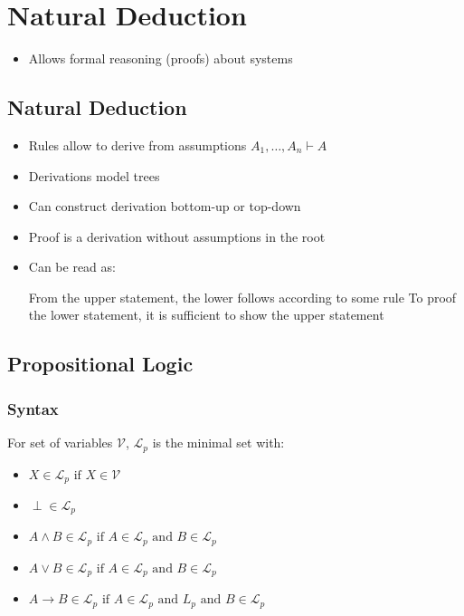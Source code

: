 
\section{Natural Deduction}
\begin{itemize}
    \item Allows formal reasoning (proofs) about systems
\end{itemize}

\subsection{Natural Deduction}
\begin{itemize}
    \item Rules allow to derive from assumptions $A_1, \dots , A_n \vdash A$
    \item Derivations model trees
    \item Can construct derivation bottom-up or top-down
    \item Proof is a derivation without assumptions in the root
    \item Can be read as:
        \begin{itemize}
             From the upper statement, the lower follows according to some rule
             To proof the lower statement, it is sufficient to show the upper statement
        \end{itemize}
\end{itemize}

\subsection{Propositional Logic}
\subsubsection{Syntax}
\begin{itemize}
     For set of variables $\mathcal{V}$, $\mathcal{L}_p$ is the minimal set with:
        \begin{itemize}
            \item $X \in \mathcal{L}_p \text{ if } X \in \mathcal{V}$
            \item $\perp \in \mathcal{L}_p$
            \item $A \wedge B \in \mathcal{L}_p \text{ if } A \in \mathcal{L}_p \text{ and } B \in \mathcal{L}_p$
            \item $A \vee B \in \mathcal{L}_p \text{ if } A \in \mathcal{L}_p \text{ and } B \in \mathcal{L}_p$
            \item $A \to B \in \mathcal{L}_p \text{ if } A \in \mathcal{L}_p \text{ and } {L}_p \text{ and } B \in \mathcal{L}_p$
        \end{itemize}
\end{itemize}


